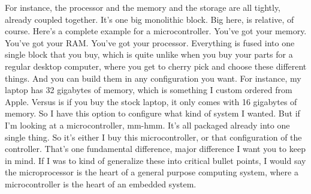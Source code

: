 For instance, the processor and the memory and the storage are all tightly, already coupled together.
It's one big monolithic block.
Big here, is relative, of course.
Here's a complete example for a microcontroller.
You've got your memory.
You've got your RAM.
You've got your processor.
Everything is fused into one single block that you buy, which is quite unlike when you buy your parts for a regular desktop computer, where you get to cherry pick and choose these different things.
And you can build them in any configuration you want.
For instance, my laptop has 32 gigabytes of memory, which is something I custom ordered from Apple.
Versus is if you buy the stock laptop, it only comes with 16 gigabytes of memory.
So I have this option to configure what kind of system I wanted.
But if I'm looking at a microcontroller, mm-hmm.
It's all packaged already into one single thing.
So it's either I buy this microcontroller, or that configuration of the controller.
That's one fundamental difference, major difference I want you to keep in mind.
If I was to kind of generalize these into critical bullet points, I would say the microprocessor is the heart of a general purpose computing system, where a microcontroller is the heart of an embedded system.


